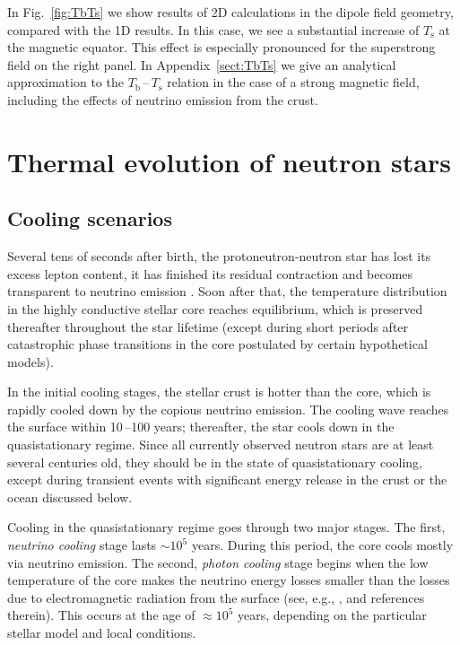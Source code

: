 \documentclass[smallextended]{svjour3}       %
\newcommand{\TbTs}{$T_\mathrm{b}$\,--\,$T_\mathrm{s}$}
\newcommand{\Ts}{T_\mathrm{s}}
\begin{document}
In Fig.~\ref{fig:TbTs} we show results of 2D calculations
in the dipole field geometry, compared with the 1D results. In this case, we see a
substantial increase of $\Ts$ at the magnetic equator. This
effect is especially pronounced for the superstrong field on
the right panel. In Appendix~\ref{sect:TbTs} we give an
analytical approximation to the \TbTs{} relation in the case
of a strong magnetic field, including the effects of
neutrino emission from the crust.

\section{Thermal evolution of neutron stars}
\label{sect:cooling}

\subsection{Cooling scenarios}
\label{sect:scenarios}

Several tens of seconds after birth, the
protoneutron-neutron star has lost its excess lepton 
content, it has finished its residual contraction and
becomes transparent to neutrino emission
\citep{Burrows86,Pons99,Roberts12}.  Soon after that, the
temperature distribution in the highly conductive stellar
core reaches equilibrium, which is preserved thereafter
throughout the star lifetime (except during short periods
after catastrophic phase transitions in the core postulated
by certain hypothetical models). 

In the initial cooling stages, the stellar crust is hotter than the
core, which is rapidly cooled down by the copious neutrino
emission. The cooling wave reaches the surface within
10\,--100 years; thereafter, the star cools down in the
quasistationary regime. Since all currently observed neutron
stars are at least several centuries old, they should be in
the state of quasistationary cooling, except during 
transient events with significant energy release in the
crust or the ocean discussed below.

Cooling in the quasistationary regime goes through two major
stages. The first, \emph{neutrino cooling} stage lasts
$\sim10^5$ years. During this period, the core cools mostly
via neutrino emission. The second, \emph{photon cooling}
stage begins when the low temperature of the core makes the neutrino energy
losses smaller than the losses due to electromagnetic
radiation from the surface (see, e.g.,
\citealp{YakovlevPethick04}, and references therein).
This occurs at the age of $\approx 10^5$ years, depending on the particular
stellar model and local conditions.
\end{document}
